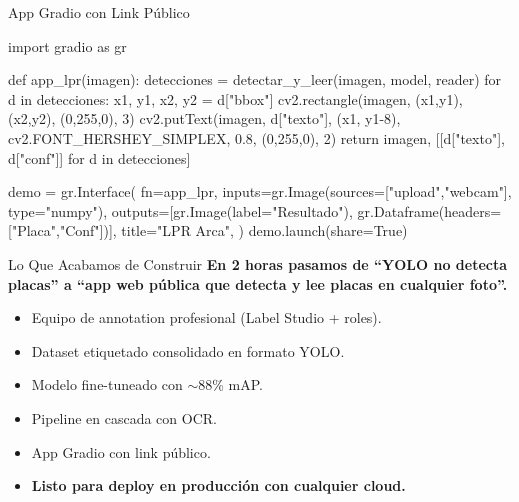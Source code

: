 \documentclass[aspectratio=169, 11pt]{beamer}
\begin{document}
\begin{frame}{App Gradio con Link P\'ublico}
  \vspace{-4pt}
  \begin{pyblock}
import gradio as gr

def app_lpr(imagen):
    detecciones = detectar_y_leer(imagen, model, reader)
    for d in detecciones:
        x1, y1, x2, y2 = d["bbox"]
        cv2.rectangle(imagen, (x1,y1), (x2,y2), (0,255,0), 3)
        cv2.putText(imagen, d["texto"], (x1, y1-8),
                    cv2.FONT_HERSHEY_SIMPLEX, 0.8, (0,255,0), 2)
    return imagen, [[d["texto"], d["conf"]] for d in detecciones]

demo = gr.Interface(
    fn=app_lpr,
    inputs=gr.Image(sources=["upload","webcam"], type="numpy"),
    outputs=[gr.Image(label="Resultado"),
             gr.Dataframe(headers=["Placa","Conf"])],
    title="LPR Arca",
)
demo.launch(share=True)
  \end{pyblock}
\end{frame}

\begin{frame}[shrink]{Lo Que Acabamos de Construir}
  \vspace{8pt}
  {\footnotesize\color{arcaDark}\bfseries
    En 2 horas pasamos de ``YOLO no detecta placas''
    a ``app web p\'ublica que detecta y lee placas en cualquier foto''.}

  \vspace{14pt}
  {\footnotesize
  \begin{itemize}\setlength{\itemsep}{6pt}
    \item[{\color{codeGreen}\scriptsize\faCheck}]
      Equipo de annotation profesional (Label Studio + roles).
    \item[{\color{codeGreen}\scriptsize\faCheck}]
      Dataset etiquetado consolidado en formato YOLO.
    \item[{\color{codeGreen}\scriptsize\faCheck}]
      Modelo fine-tuneado con $\sim$88\% mAP.
    \item[{\color{codeGreen}\scriptsize\faCheck}]
      Pipeline en cascada con OCR.
    \item[{\color{codeGreen}\scriptsize\faCheck}]
      App Gradio con link p\'ublico.
    \item[{\color{arcaRed}\scriptsize\faArrowRight}]
      \textbf{Listo para deploy en producci\'on con cualquier cloud.}
  \end{itemize}
  }
\end{frame}
\end{document}
